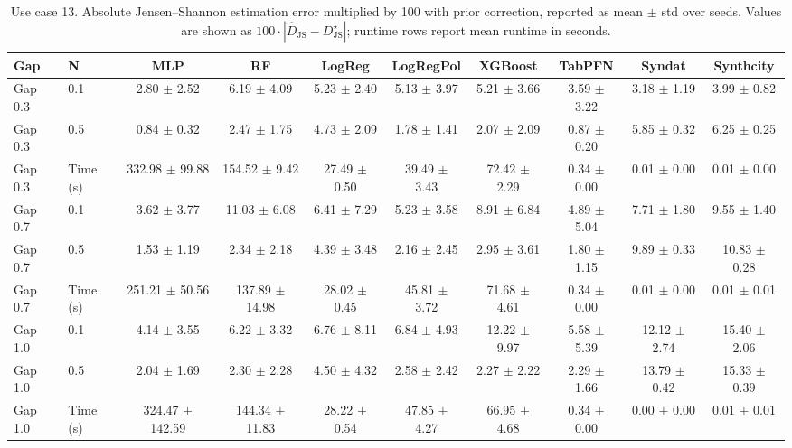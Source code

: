 \begin{table}[ht]
\centering
\scriptsize
\setlength{\tabcolsep}{2.3pt}
\caption{Use case 13. Absolute Jensen--Shannon estimation error multiplied by 100 with prior correction, reported as mean $\pm$ std over seeds. Values are shown as $100 \cdot |\widehat{D}_{\mathrm{JS}} - D_{\mathrm{JS}}^{\star}|$; runtime rows report mean runtime in seconds.}
\label{tab:uc13_on_abs_error_x100_all_gaps_mean_std}
\begin{tabular}{llcccccccc}
\toprule
Gap & N & MLP & RF & LogReg & LogRegPol & XGBoost & TabPFN & Syndat & Synthcity \\
\midrule
\midrule
Gap 0.3 & 0.1 & 2.80 $\pm$ 2.52 & 6.19 $\pm$ 4.09 & 5.23 $\pm$ 2.40 & 5.13 $\pm$ 3.97 & 5.21 $\pm$ 3.66 & 3.59 $\pm$ 3.22 & 3.18 $\pm$ 1.19 & 3.99 $\pm$ 0.82 \\
Gap 0.3 & 0.5 & 0.84 $\pm$ 0.32 & 2.47 $\pm$ 1.75 & 4.73 $\pm$ 2.09 & 1.78 $\pm$ 1.41 & 2.07 $\pm$ 2.09 & 0.87 $\pm$ 0.20 & 5.85 $\pm$ 0.32 & 6.25 $\pm$ 0.25 \\
Gap 0.3 & Time (s) & 332.98 $\pm$ 99.88 & 154.52 $\pm$ 9.42 & 27.49 $\pm$ 0.50 & 39.49 $\pm$ 3.43 & 72.42 $\pm$ 2.29 & 0.34 $\pm$ 0.00 & 0.01 $\pm$ 0.00 & 0.01 $\pm$ 0.00 \\
\midrule
Gap 0.7 & 0.1 & 3.62 $\pm$ 3.77 & 11.03 $\pm$ 6.08 & 6.41 $\pm$ 7.29 & 5.23 $\pm$ 3.58 & 8.91 $\pm$ 6.84 & 4.89 $\pm$ 5.04 & 7.71 $\pm$ 1.80 & 9.55 $\pm$ 1.40 \\
Gap 0.7 & 0.5 & 1.53 $\pm$ 1.19 & 2.34 $\pm$ 2.18 & 4.39 $\pm$ 3.48 & 2.16 $\pm$ 2.45 & 2.95 $\pm$ 3.61 & 1.80 $\pm$ 1.15 & 9.89 $\pm$ 0.33 & 10.83 $\pm$ 0.28 \\
Gap 0.7 & Time (s) & 251.21 $\pm$ 50.56 & 137.89 $\pm$ 14.98 & 28.02 $\pm$ 0.45 & 45.81 $\pm$ 3.72 & 71.68 $\pm$ 4.61 & 0.34 $\pm$ 0.00 & 0.01 $\pm$ 0.00 & 0.01 $\pm$ 0.01 \\
\midrule
Gap 1.0 & 0.1 & 4.14 $\pm$ 3.55 & 6.22 $\pm$ 3.32 & 6.76 $\pm$ 8.11 & 6.84 $\pm$ 4.93 & 12.22 $\pm$ 9.97 & 5.58 $\pm$ 5.39 & 12.12 $\pm$ 2.74 & 15.40 $\pm$ 2.06 \\
Gap 1.0 & 0.5 & 2.04 $\pm$ 1.69 & 2.30 $\pm$ 2.28 & 4.50 $\pm$ 4.32 & 2.58 $\pm$ 2.42 & 2.27 $\pm$ 2.22 & 2.29 $\pm$ 1.66 & 13.79 $\pm$ 0.42 & 15.33 $\pm$ 0.39 \\
Gap 1.0 & Time (s) & 324.47 $\pm$ 142.59 & 144.34 $\pm$ 11.83 & 28.22 $\pm$ 0.54 & 47.85 $\pm$ 4.27 & 66.95 $\pm$ 4.68 & 0.34 $\pm$ 0.00 & 0.00 $\pm$ 0.00 & 0.01 $\pm$ 0.01 \\
\bottomrule
\end{tabular}
\end{table}